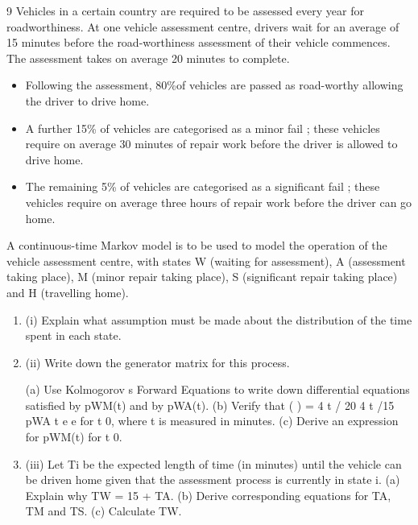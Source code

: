 \documentclass[a4paper,12pt]{article}
\begin{document}
\begin{enumerate}

9 Vehicles in a certain country are required to be assessed every year for roadworthiness. At one vehicle assessment centre, drivers wait for an average of 15
minutes before the road-worthiness assessment of their vehicle commences. The
assessment takes on average 20 minutes to complete. 

\begin{itemize}
\item Following the assessment, 80\%of vehicles are passed as road-worthy allowing the driver to drive home. 
\item A further 15\% of vehicles are categorised as a minor fail ; these vehicles require on average 30 minutes of repair work before the driver is allowed to drive home. 
\item The remaining 5\% of vehicles are categorised as a significant fail ; these vehicles require on average three hours of repair work before the driver can go home.
\end{itemize}
A continuous-time Markov model is to be used to model the operation of the vehicle assessment centre, with states W (waiting for assessment), A (assessment taking place), M (minor repair taking place), S (significant repair taking place) and H
(travelling home).

\begin{enumerate}
\item (i) Explain what assumption must be made about the distribution of the time
spent in each state.
\item (ii) Write down the generator matrix for this process.

(a) Use Kolmogorov s Forward Equations to write down differential
equations satisfied by pWM(t) and by pWA(t).
(b) Verify that ( ) = 4 t / 20 4 t /15
pWA t e e for t 0, where t is measured in
minutes.
(c) Derive an expression for pWM(t) for t 0.
\item 
(iii) Let Ti be the expected length of time (in minutes) until the vehicle can be
driven home given that the assessment process is currently in state i.
(a) Explain why TW = 15 + TA.
(b) Derive corresponding equations for TA, TM and TS.
(c) Calculate TW.
\end{enumerate}
\newpage




\end{enumerate}
\end{document}

